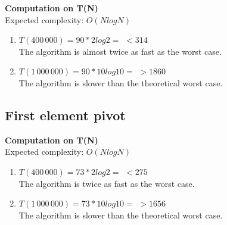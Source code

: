 \documentclass{article}
\begin{document}
\textbf{Computation on T(N)}\\

Expected complexity: $O(NlogN)$\\

\begin{enumerate}
    \item $T(400\,000) = 90 *2 log 2 =$
    $< 314$\\
    The algorithm is almost twice as fast as the worst case.
    
    \item $T(1\,000\,000) = 90 *10 log 10 =$
    $> 1860$\\
    The algorithm is slower than the theoretical worst case.
    
\end{enumerate}

\newpage
\subsection{First element pivot}

\begin{center}
\end{center}

\textbf{Computation on T(N)}\\

Expected complexity: $O(NlogN)$\\

\begin{enumerate}
    \item $T(400\,000) = 73 *2 log 2 =$
    $< 275$\\
    The algorithm is twice as fast as the worst case.
    
    \item $T(1\,000\,000) = 73 *10 log 10 =$
    $> 1656$\\
    The algorithm is slower than the theoretical worst case.
    
\end{enumerate}
\end{document}
